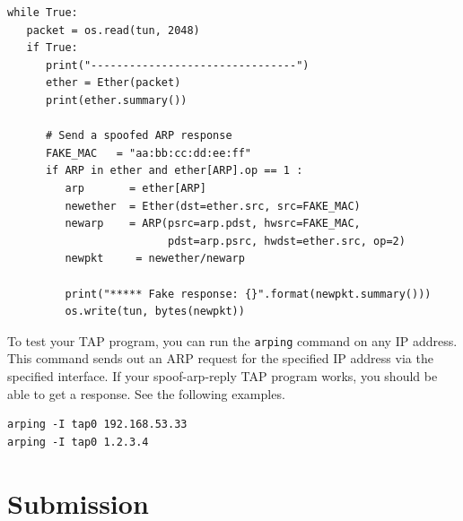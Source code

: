 \begin{lstlisting}
while True:
   packet = os.read(tun, 2048)
   if True:
      print("--------------------------------")
      ether = Ether(packet)
      print(ether.summary())

      # Send a spoofed ARP response
      FAKE_MAC   = "aa:bb:cc:dd:ee:ff"
      if ARP in ether and ether[ARP].op == 1 :
         arp       = ether[ARP]
         newether  = Ether(dst=ether.src, src=FAKE_MAC)
         newarp    = ARP(psrc=arp.pdst, hwsrc=FAKE_MAC,
                         pdst=arp.psrc, hwdst=ether.src, op=2)
         newpkt     = newether/newarp

         print("***** Fake response: {}".format(newpkt.summary()))
         os.write(tun, bytes(newpkt))
\end{lstlisting}

To test your TAP program, you can run the \texttt{arping} command
on any IP address.  This command sends out an ARP request for the specified IP address 
via the specified interface. 
If your spoof-arp-reply TAP program works, you should be able to get a 
response. See the following examples. 

\begin{lstlisting}
arping -I tap0 192.168.53.33
arping -I tap0 1.2.3.4
\end{lstlisting}

 
 
\section{Submission}












